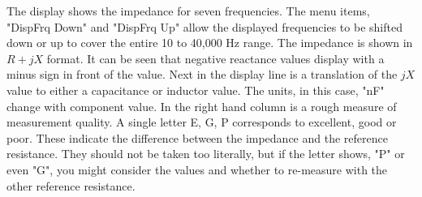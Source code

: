 %
The display shows the impedance for seven frequencies.
The menu items, "DispFrq Down" and "DispFrq Up" allow the displayed frequencies to be shifted down or up to cover the entire 10 to 40,000 Hz range.  The impedance is shown in  \(R+jX\) format.
It can be seen that negative reactance values display with a minus sign in front of the value.
Next in the display line is a translation of the  \(jX\) value to either a capacitance or inductor value.
The units, in this case,  "nF" change with component value.  In the right hand column is a rough measure of measurement quality.
A single letter E, G, P corresponds to excellent, good or poor.
These indicate the difference between the impedance and the reference resistance.
They should not be taken too literally, but if the letter shows, "P" or even "G",  you might consider the values and whether to re-measure with the other reference resistance.

